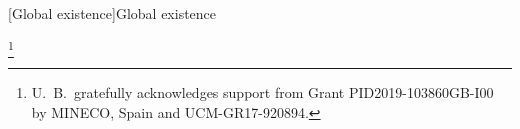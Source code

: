 \documentclass[11pt,reqno]{amsart}
\numberwithin{equation}{section}
\theoremstyle{definition}
\theoremstyle{plain}
\begin{document}
\tableofcontents
\listoftheorems[showall,ignore={remark},numwidth=3em]
\renewenvironment{proof}[1][\proofname]{{\bfseries Proof of #1.}}
\title[Global existence]{Global  existence}
\author[U.~Brauer]{Uwe Brauer}
\address{Uwe Brauer Departamento de Matemática Aplicada\\ Universidad
Complutense Madrid 28040 Madrid, Spain} 
\thanks{U.~B.~gratefully acknowledges support from Grant  PID2019-103860GB-I00 by
MINECO, Spain and UCM-GR17-920894.} 
\author[L.~Karp]{Lavi Karp}
\address{%
Lavi Karp
Department of Mathematics\\ ORT Braude College\\
P.O. 
Box 78, 21982 Karmiel\\ Israel}
\keywords{}
\begin{abstract}
\end{abstract}
\maketitle{}
\tableofcontents
\makeatletter
\providecommand\@dotsep{5}
\makeatother
\listoftodos\relax
\def\biblio{}





 

\printbibliography
\printbibitembibliography
\end{document}
